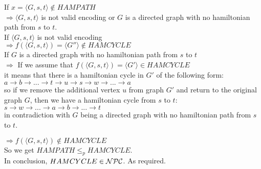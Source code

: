 If $x = \langle  G, s, t \rangle \notin HAMPATH$ \\
$\Rightarrow \langle  G, s, t \rangle$ is not valid encoding or $G$ is a directed graph with no hamiltonian path from $s$ to $t$. \\
If $\langle  G, s, t \rangle$ is not valid encoding \\
$\Rightarrow f(\langle  G, s, t \rangle) = \langle G'' \rangle \notin HAMCYCLE$ \\
If $G$ is a directed graph with no hamiltonian path from $s$ to $t$ \\
$\Rightarrow $ If we assume that $f(\langle  G, s, t \rangle) = \langle G' \rangle \in HAMCYCLE$ \\
it means that there is a hamiltonian cycle in $G'$ of the following form:\\
$a \rightarrow b \rightarrow ... \rightarrow t \rightarrow u \rightarrow s \rightarrow w \rightarrow ... \rightarrow a$ \\
so if we remove the additional vertex $u$ from graph $G'$ and return to the original graph $G$,
then we have a hamiltonian cycle from $s$ to $t$: \\
$s \rightarrow w \rightarrow ... \rightarrow a \rightarrow b \rightarrow ... \rightarrow t$\\
in contradiction with $G$ being a directed graph with no hamiltonian path from $s$ to $t$.

$\Rightarrow f(\langle  G, s, t \rangle) \notin HAMCYCLE$ \\

So we get \underline{$HAMPATH \leq_p HAMCYCLE$}. \\
In conclusion, $HAMCYCLE \in \mathcal{N}\mathcal{P}\mathcal{C}$. As required.

